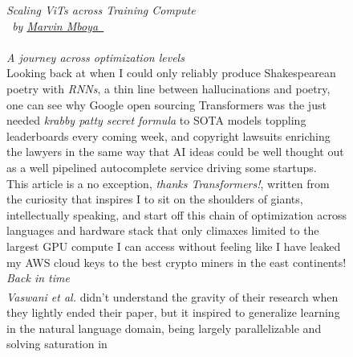 \documentclass[12pt]{article}
\newcommand{\sidecite}[1]{\textsuperscript{\textcolor{blue}{\textbf{\scriptsize#1}}}}
\newcommand{\maincitecount}{\sidecite{\stepcounter{maincite}\themaincite}}
\begin{document}

\linespread{1.2}\selectfont
\author{Marvin}
\date{\today}


\begin{figure}[!htb]
    \begin{minipage}[t]{0.65\textwidth}
    {\sffamily 
    \fontsize{21}{8}\textcolor{xtitle}{\textit{Scaling ViTs across Training Compute}}\\
    \fontsize{9}{8}\textcolor{xtitle}{
        \textit{
            \ by \href{https://www.linkedin.com/in/marvin-mboya}{Marvin Mboya\ \faLinkedinSquare}
    }}\\
    }\\
    [-0.3cm]
    \textcolor{xtitle}{{\it A journey across optimization levels}}\\
    [0.2cm]
    \normalsize
    Looking back at when I could only reliably produce Shakespearean poetry with {\it RNNs}, a thin line between hallucinations 
    and poetry, one can see why Google open sourcing Transformers was the just needed {\it krabby patty secret formula} to SOTA 
    models toppling leaderboards every coming week, and copyright lawsuits enriching the lawyers in the same way that AI ideas 
    could be well thought out as a well pipelined autocomplete service driving some startups.\\ 
    This article is a no exception, {\it thanks Transformers!}, written from the curiosity that inspires I to 
    sit on the shoulders of giants, intellectually speaking, and start off this chain of optimization across languages and hardware 
    stack that only climaxes limited to the largest GPU compute I can access without feeling like I have leaked my AWS cloud keys 
    to the best crypto miners in the east continents!
    \vspace{1.5em}\\
    \fontsize{14}{8}\textcolor{xtitle}{\textit{Back in time}}\\
    {\it Vaswani et al.} didn't understand the gravity of their research{\maincitecount} when they lightly ended their paper, but 
    it inspired to generalize learning in the natural language domain, being largely parallelizable and solving saturation in 

\end{minipage}
\end{figure}
\end{document}
